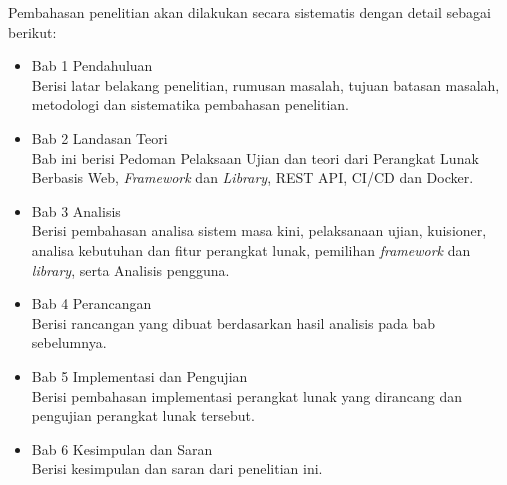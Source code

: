 Pembahasan penelitian akan dilakukan secara sistematis dengan detail sebagai
berikut:

\begin{itemize}
    \item Bab 1 Pendahuluan \\
        Berisi latar belakang penelitian, rumusan masalah, tujuan batasan
        masalah, metodologi dan sistematika pembahasan penelitian.
    
    \item Bab 2 Landasan Teori \\
        Bab ini berisi Pedoman Pelaksaan Ujian dan teori dari Perangkat Lunak
        Berbasis Web, \textit{Framework} dan
        \textit{Library}, REST API, CI/CD dan Docker.
        
    \item Bab 3 Analisis \\
        Berisi pembahasan analisa sistem masa kini, pelaksanaan ujian,
        kuisioner, analisa kebutuhan dan fitur perangkat lunak, pemilihan
        \textit{framework} dan \textit{library}, serta Analisis pengguna.
        
    \item Bab 4 Perancangan \\
        Berisi rancangan yang dibuat berdasarkan hasil analisis pada bab
        sebelumnya.
    
    \item Bab 5 Implementasi dan Pengujian \\
        Berisi pembahasan implementasi perangkat lunak yang dirancang dan
        pengujian perangkat lunak tersebut.
        
    \item Bab 6 Kesimpulan dan Saran \\
        Berisi kesimpulan dan saran dari penelitian ini.
\end{itemize}